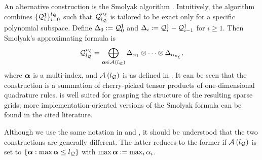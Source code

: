 An alternative construction is the Smolyak algorithm \cite{maitre2010, eldred2008}.
Intuitively, the algorithm combines $\{ \quadrature{1}{i} \}_{i = 0}^\nqlevel$ such that $\quadrature$ is tailored to be exact only for a specific polynomial subspace.
Define $\Delta_0 := \quadrature{1}{0}$ and $\Delta_i := \quadrature{1}{i} - \quadrature{1}{i - 1}$ for $i \geq 1$.
Then Smolyak's approximating formula is
\begin{equation} \xelab{smolyak-sparse-grid}
  \quadrature = \bigoplus_{\multiindex \in \quadratureMultiindexSet{\nqlevel}} \Delta_{\alpha_1} \otimes \cdots \otimes \Delta_{\alpha_\nvars},
\end{equation}
where $\bm{\alpha}$ is a multi-index, and $\mathcal{A}_{}\left( {l_\mathcal{Q}} \right)$ is as defined in .
It can be seen that the construction is a summation of cherry-picked tensor products of one-dimensional quadrature rules.
 is well suited for grasping the structure of the resulting sparse grids; more implementation-oriented versions of the Smolyak formula can be found in the cited literature.
\begin{remark}
Although we use the same notation in  and , it should be understood that the two constructions are generally different.
The latter reduces to the former if $\mathcal{A}_{}\left( {l_\mathcal{Q}} \right)$ is set to $\{ \bm{\alpha}: \max \bm{\alpha} \leq {l_\mathcal{Q}} \}$ with $\max \bm{\alpha} := \max_i \alpha_i$.
\end{remark}
